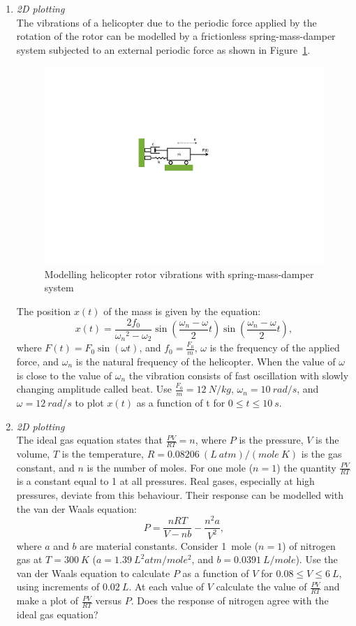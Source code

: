 \begin{enumerate}
\newpage
\item \textit{2D plotting}\\
The vibrations of a helicopter due to the periodic force applied by the rotation of the rotor can be modelled by a frictionless spring-mass-damper system subjected to an external periodic force as shown in Figure~\ref{fig:heli-vib}. 
\begin{figure}[h]
	\myfloatalign
	\includegraphics[width=0.55\linewidth]{Graphics/Additional-Ex/heli-vib}
	\caption{Modelling helicopter rotor vibrations with spring-mass-damper system}
	\label{fig:heli-vib}
\end{figure}
The position $x(t)$ of the mass is given by the equation:
\begin{equation*}
x(t) = \frac{2f_0}{{\omega_n}^2 - \omega_2} \sin \left( \frac{\omega_n - \omega}{2} t \right) \sin \left( \frac{\omega_n - \omega}{2} t \right),
\end{equation*}
where $F(t) = F_0 \sin(\omega t)$, and $f_0 = \frac{F_0}{m}$, $\omega$ is the frequency of the applied force, and $\omega_n$ is the natural frequency of the helicopter. When the value of $\omega$ is close to the value of $\omega_n$ the vibration consists of fast oscillation with slowly changing amplitude called beat. Use $\frac{F_0}{m} = 12~N/kg$, $\omega_n = 10~rad/s$, and $\omega = 12~rad/s$ to plot $x(t)$ as a function of t for $0\leq t\leq 10~s$.

\item \textit{2D plotting}\\
The ideal gas equation states that $\frac{PV}{RT} = n$, where $P$ is the pressure, $V$ is the volume, $T$ is the temperature, $R = 0.08206~(L~atm)/(mole~K)$ is the gas constant, and $n$ is the number of moles. For one mole ($n=1$) the quantity $\frac{PV}{RT}$ is a constant equal to 1 at all pressures. Real gases, especially at high pressures, deviate from this behaviour. Their response can be modelled with the van der Waals equation:
\begin{equation*}
P = \frac{nRT}{V-nb} - \frac{n^2a}{V^2},
\end{equation*}
where $a$ and $b$ are material constants. Consider 1~mole ($n=1$) of nitrogen gas at $T=300~K$ ($a=1.39~L^2atm/mole^2$, and $b=0.0391~L/mole$). Use the van der Waals equation to calculate $P$ as a function of $V$ for $0.08\leq V \leq 6~L$, using increments of $0.02~L$. At each value of $V$ calculate the value of $\frac{PV}{RT}$ and make a plot of $\frac{PV}{RT}$ versus $P$. Does the response of nitrogen agree with the ideal gas equation?


\end{enumerate}
